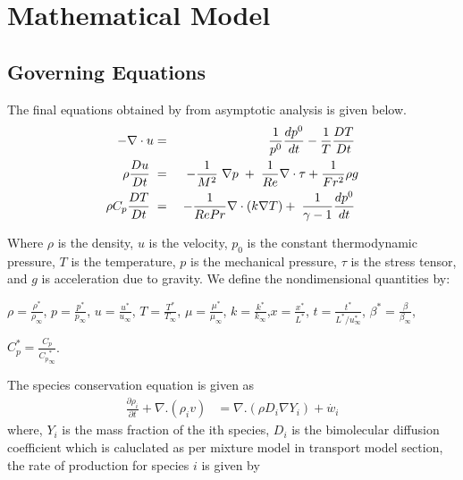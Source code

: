 \chapter{Mathematical Model}


\section{Governing Equations}


The final equations obtained by from asymptotic analysis is given below. 
\begin{eqnarray}
-\nabla \cdot u &=& \frac{1}{p^0} \frac{d p^0}{d t} - \frac{1}{T}\frac{D T}{D t} \hspace{1mm}\\
\rho \frac{D u}{D t} \hspace{1mm} &=& -\frac{1}{M^2}\hspace{1mm}\nabla p\hspace{1mm}+\hspace{1mm}\frac{1}{Re}\nabla \cdot \tau + \frac{1}{Fr^2}\rho g \\
\rho C_p \frac{D T}{D t} \hspace{1mm}&=&\hspace{1mm} -  \frac{1}{Re Pr}\nabla\cdot (k \nabla T) + \hspace{1mm} \frac{1}{\gamma -1} \frac{d p^0}{d t}\hspace{1mm}\\
\end{eqnarray}

\noindent Where $\rho$ is the density, $u$ is the velocity, $p_0$ is the constant thermodynamic pressure, $T$ is the temperature, $p$ is the mechanical pressure,  $\tau$ is the stress tensor, and $g$ is acceleration due to gravity.   We define the nondimensional quantities by:\\

\bigskip

$\rho = \frac{\rho^*}{\rho_\infty} $, $p = \frac{p^*}{p_\infty} $, $u = \frac{u^*}{u_\infty} $, $T = \frac{T^*}{T_\infty} $, $\mu = \frac{\mu^*}{\mu_\infty} $, $k = \frac{k^*}{k_\infty} $,$x = \frac{x^*}{L^*} $, $t = \frac{t^*}{L^*/u^*_{\infty}} $, $\beta^* = \frac{\beta}{\beta_{\infty}} $, 
\bigskip

$C_p^* = \frac{C_p}{{C_p}^*_{\infty}}$.

\noindent The species conservation equation is given as 
\begin{eqnarray}
	\frac{\partial \rho_i}{\partial t} + \nabla . (\rho_i v) &= \nabla . (\rho D_{i} \nabla Y_i) + \dot{w_i}
\end{eqnarray}
\noindent where, $Y_i$ is the mass fraction of the ith species, $D_i$ is the bimolecular diffusion coefficient which is caluclated as per mixture model in transport model section, the rate of production for species $i$ is given by
	
